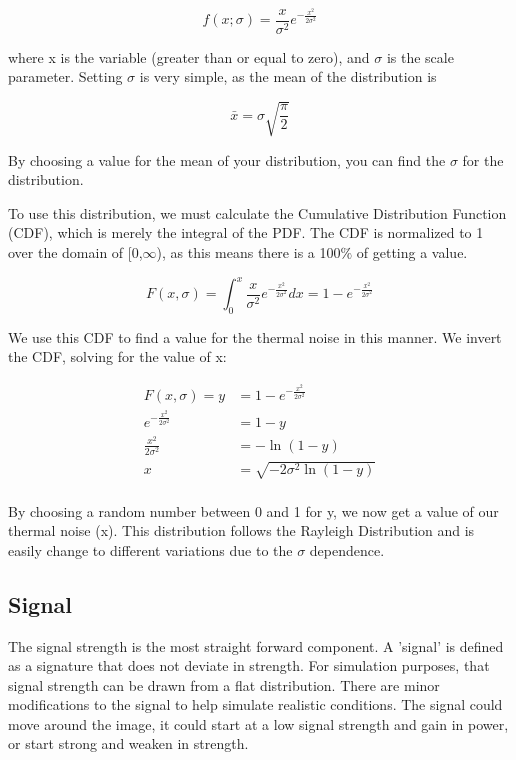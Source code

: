 \documentclass[12pt]{article} %
\begin{document}
\begin{equation}
f(x;\sigma) = \frac{x}{\sigma^2} e^{-\frac{x^2}{2 \sigma^2}}
\end{equation}

where x is the variable (greater than or equal to zero), and $\sigma$ is the scale parameter. Setting $\sigma$ is very simple, as the mean of the distribution is

\begin{equation}
\bar{x} = \sigma \sqrt{\frac{\pi}{2}}
\end{equation}

By choosing a value for the mean of your distribution, you can find the $\sigma$ for the distribution. 

To use this distribution, we must calculate the Cumulative Distribution Function (CDF), which is merely the integral of the PDF.  The CDF is normalized to 1 over the domain of [0,$\infty$), as this means there is a 100$\%$ of getting a value. 

\begin{equation}
F(x,\sigma) = \int_{0}^{x}   \frac{x}{\sigma^2} e^{-\frac{x^2}{2 \sigma^2}}dx = 1-e^{-\frac{x^2}{2 \sigma^2}}
\end{equation}

We use this CDF to find a value for the thermal noise in this manner. We invert the CDF, solving for the value of x:

\begin{align*}
F(x,\sigma) = y &= 1-e^{-\frac{x^2}{2 \sigma^2}} \\
e^{-\frac{x^2}{2 \sigma^2}} &= 1-y \\
\frac{x^2}{2 \sigma^2} &= - \ln \left(1-y\right) \\
x &= \sqrt{-2 \sigma^2 \ln \left(1-y\right)}\\
\end{align*}

By choosing a random number between 0 and 1 for y, we now get a value of our thermal noise (x). This distribution follows the Rayleigh Distribution and is easily change to different variations due to the $\sigma$ dependence.

\subsection{Signal}

The signal strength is the most straight forward component. A 'signal' is defined as a signature that does not deviate in strength. For simulation purposes, that signal strength can be drawn from a flat distribution. There are minor modifications to the signal to help simulate realistic conditions. The signal could move around the image, it could start at a low signal strength and gain in power, or start strong and weaken in strength. 
\end{document}
